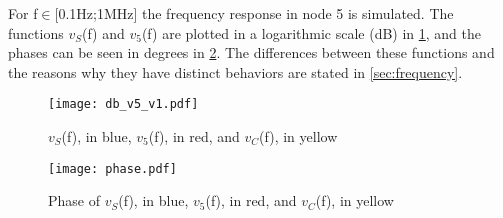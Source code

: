 For f$\in$[0.1Hz;1MHz] the frequency response in node 5 is simulated. The functions $v_S$(f) and $v_5$(f) are plotted in a logarithmic scale (dB) in \ref{fig:db_v5_v1.pdf}, and the phases can be seen in degrees in \ref{fig:phase.pdf}. The differences between these functions and the reasons why they have distinct behaviors are stated in \ref{sec:frequency}.

\begin{figure}[h] \centering
\texttt{[image: db\_v5\_v1.pdf]}
\caption{$v_S$(f), in blue, $v_5$(f), in red, and $v_C$(f), in yellow}
\label{fig:db_v5_v1.pdf}
\end{figure}
\FloatBarrier

\begin{figure}[h] \centering
\texttt{[image: phase.pdf]}
\caption{Phase of $v_S$(f), in blue, $v_5$(f), in red, and $v_C$(f), in yellow}
\label{fig:phase.pdf}
\end{figure}
\FloatBarrier
